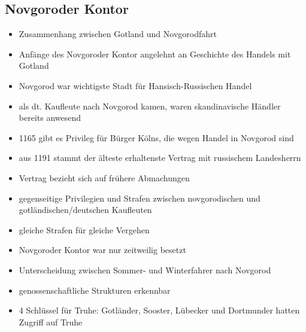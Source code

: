 \documentclass[10pt,a4paper,oneside,ngerman,numbers=noenddot]{scrartcl}
\newenvironment{myitemize}{\begin{itemize}\itemsep -8pt}{\end{itemize}} %
\begin{document}
\subsection*{Novgoroder Kontor}
\begin{myitemize}
    \item Zusammenhang zwischen Gotland und Novgorodfahrt
    \item Anfänge des Novgoroder Kontor angelehnt an Geschichte des Handels mit Gotland
    \item Novgorod war wichtigste Stadt für Hansisch-Russischen Handel
    \item als dt. Kaufleute nach Novgorod kamen, waren skandinavische Händler bereits anwesend
    \item 1165 gibt es Privileg für Bürger Kölns, die wegen Handel in Novgorod sind
    \item aus 1191 stammt der älteste erhaltenste Vertrag mit russischem Landesherrn
    \item Vertrag bezieht sich auf frühere Abmachungen
    \item gegenseitige Privilegien und Strafen zwischen novgorodischen und gotländischen/deutschen Kaufleuten
    \item gleiche Strafen für gleiche Vergehen
    \item Novgoroder Kontor war nur zeitweilig besetzt
    \item Unterscheidung zwischen Sommer- und Winterfahrer nach Novgorod
    \item genossenschaftliche Strukturen erkennbar
    \item 4 Schlüssel für Truhe: Gotländer, Sooster, Lübecker und Dortmunder hatten Zugriff auf Truhe
\end{myitemize}
\end{document}
